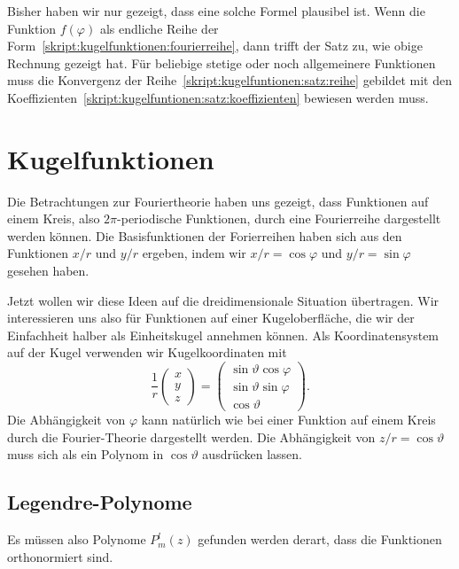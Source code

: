 Bisher haben wir nur gezeigt, dass eine solche Formel plausibel ist.
Wenn die Funktion $f(\varphi)$ als endliche Reihe der
Form~\eqref{skript:kugelfunktionen:fourierreihe}, dann trifft der
Satz zu, wie obige Rechnung gezeigt hat.
Für beliebige stetige oder noch allgemeinere Funktionen muss
die Konvergenz der Reihe~\eqref{skript:kugelfuntionen:satz:reihe}
gebildet mit den
Koeffizienten~\eqref{skript:kugelfuntionen:satz:koeffizienten}
bewiesen werden muss.

\section{Kugelfunktionen}
Die Betrachtungen zur Fouriertheorie haben uns gezeigt, dass Funktionen
auf einem Kreis, also $2\pi$-periodische Funktionen, durch eine
Fourierreihe dargestellt werden können.
Die Basisfunktionen der Forierreihen haben sich aus den
Funktionen $x/r$ und $y/r$ ergeben, indem wir $x/r=\cos\varphi$
und $y/r=\sin\varphi$ gesehen haben.

Jetzt wollen wir diese Ideen auf die dreidimensionale Situation
übertragen.
Wir interessieren uns also für Funktionen auf einer Kugeloberfläche,
die wir der Einfachheit halber als Einheitskugel annehmen können.
Als Koordinatensystem auf der Kugel verwenden wir Kugelkoordinaten mit
\begin{equation}
\frac1r
\begin{pmatrix}
x\\y\\z
\end{pmatrix}
=
\begin{pmatrix}
\sin\vartheta\cos\varphi\\
\sin\vartheta\sin\varphi\\
\cos\vartheta
\end{pmatrix}.
\end{equation}
Die Abhängigkeit von $\varphi$ kann natürlich wie bei einer Funktion
auf einem Kreis durch die Fourier-Theorie dargestellt werden.
Die Abhängigkeit von $z/r=\cos\vartheta$ muss sich als ein Polynom
in $\cos\vartheta$ ausdrücken lassen.

\subsection{Legendre-Polynome}
Es müssen also Polynome $P_m^l(z)$ gefunden werden derart, dass 
die Funktionen
orthonormiert sind.













